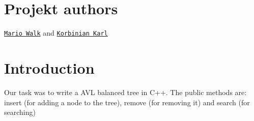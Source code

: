 \hypertarget{index_authors_sec}{}\section{Projekt authors}\label{index_authors_sec}
\href{https://github.com/walkmario}{\tt Mario Walk} and \href{https://github.com/korbster}{\tt Korbinian Karl}\hypertarget{index_intro_sec}{}\section{Introduction}\label{index_intro_sec}
Our task was to write a A\-V\-L balanced tree in C++. The public methods are\-: insert (for adding a node to the tree), remove (for removing it) and search (for searching) 